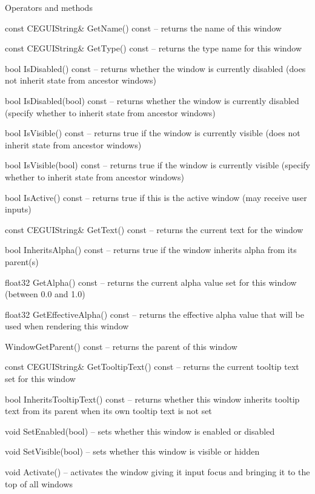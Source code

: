 \begin{titled-itemize}{Operators and methods}
  \item const CEGUIString\& GetName() const -- returns the name of this window
  \item const CEGUIString\& GetType() const -- returns the type name for this window
  \item bool IsDisabled() const -- returns whether the window is currently disabled (does not inherit state from ancestor windows)
  \item bool IsDisabled(bool) const -- returns whether the window is currently disabled (specify whether to inherit state from ancestor windows)
  \item bool IsVisible() const -- returns true if the window is currently visible (does not inherit state from ancestor windows)
  \item bool IsVisible(bool) const -- returns true if the window is currently visible (specify whether to inherit state from ancestor windows)
  \item bool IsActive() const -- returns true if this is the active window (may receive user inputs)
  \item const CEGUIString\& GetText() const -- returns the current text for the window
  \item bool InheritsAlpha() const -- returns true if the window inherits alpha from its parent(s)
  \item float32 GetAlpha() const -- returns the current alpha value set for this window (between 0.0 and 1.0)
  \item float32 GetEffectiveAlpha() const -- returns the effective alpha value that will be used when rendering this
 window
  \item Window\@ GetParent() const -- returns the parent of this window
  \item const CEGUIString\& GetTooltipText() const -- returns the current tooltip text set for this window
  \item bool InheritsTooltipText() const -- returns whether this window inherits tooltip text from its parent when
 its own tooltip text is not set
  \item void SetEnabled(bool) -- sets whether this window is enabled or disabled
  \item void SetVisible(bool) -- sets whether this window is visible or hidden
  \item void Activate() -- activates the window giving it input focus and bringing it to the top of
 all windows

\end{titled-itemize}
